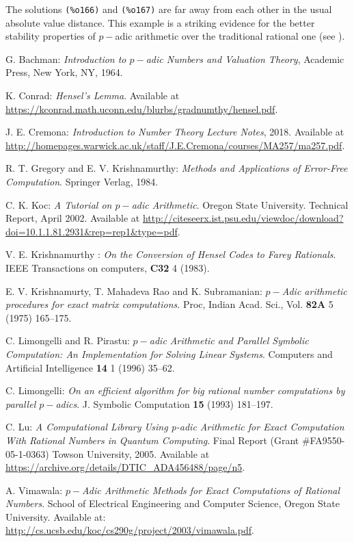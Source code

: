 \documentclass[fleqn]{cas-sc}
\begin{document}
The solutions \texttt{(\%o166)} and \texttt{(\%o167)} are far away 
from each other in the usual absolute 	value distance. This example
is a striking evidence for the better stability 	properties of $p-$adic
arithmetic over the traditional rational one (see \cite{7,4,3,5,6,11}).




%
\begin{thebibliography}{99}
 G. Bachman: \emph{Introduction to $p-$adic Numbers and Valuation Theory}, 
Academic Press, New York, NY, 1964.

 K. Conrad: \emph{Hensel's Lemma}. Available at
\url{https://kconrad.math.uconn.edu/blurbs/gradnumthy/hensel.pdf}.

 J. E. Cremona: \emph{Introduction to Number Theory Lecture Notes}, 2018.
Available at \url{http://homepages.warwick.ac.uk/staff/J.E.Cremona/courses/MA257/ma257.pdf}.

 R. T. Gregory and E. V. Krishnamurthy: \emph{Methods and Applications
of Error-Free Computation}. Springer Verlag, 1984.

 C. K. Koc: \emph{A Tutorial on $p-$adic Arithmetic}. Oregon State University. 
Technical Report, April 2002. Available at
\url{http://citeseerx.ist.psu.edu/viewdoc/download?doi=10.1.1.81.2931&rep=rep1&type=pdf}.

 V. E. Krishnamurthy : \emph{On the Conversion of Hensel Codes to Farey
Rationals}. IEEE Transactions on computers, \textbf{C32} 4 (1983).

 E. V. Krishnamurty, T. Mahadeva Rao and K. Subramanian: \emph{$p-$Adic
arithmetic procedures for exact matrix computations}. Proc, Indian Acad.
Sci., Vol. \textbf{82A} 5 (1975) 165--175.
 
 C. Limongelli and R. Pirastu: \emph{$p-$adic Arithmetic and Parallel Symbolic
Computation: An Implementation for Solving Linear Systems}.
Computers and Artificial Intelligence \textbf{14} 1 (1996) 35--62.

 C. Limongelli: \emph{On an efficient algorithm for big rational number
computations by parallel $p-$adics}. J. Symbolic Computation \textbf{15} (1993) 181--197.

 C. Lu: \emph{A Computational Library Using p-adic Arithmetic for Exact
Computation With Rational Numbers in Quantum Computing}. Final 
Report (Grant \#FA9550-05-1-0363) Towson University, 2005. Available at
\url{https://archive.org/details/DTIC_ADA456488/page/n5}.

 A. Vimawala: \emph{$p-$Adic Arithmetic Methods for Exact Computations
of Rational Numbers}. School of Electrical Engineering and Computer Science,
Oregon State University. Available at:
\url{http://cs.ucsb.edu/koc/cs290g/project/2003/vimawala.pdf}.


\end{thebibliography}
\end{document}
